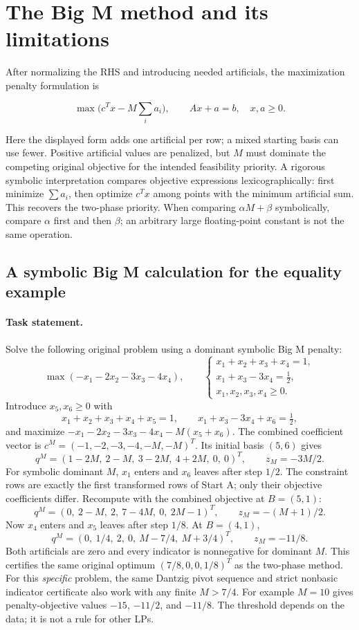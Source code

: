 \documentclass[11pt,a4paper]{article}
\begin{document}
\section{The Big M method and its limitations}\label{sec:big-m}
After normalizing the RHS and introducing needed artificials, the maximization
penalty formulation is
\begin{lecturecore}
  \begin{equation}\label{eq:big-m}
    \max\bigl(c^Tx-M\textstyle\sum_i a_i\bigr),\qquad
    Ax+a=b,\quad x,a\geq0.
  \end{equation}
\end{lecturecore}
Here the displayed form adds one artificial per row; a mixed starting basis
can use fewer. Positive artificial values are penalized, but $M$ must dominate
the competing original objective for the intended feasibility priority.
A rigorous symbolic interpretation compares objective expressions
lexicographically: first minimize $\sum a_i$, then optimize $c^Tx$ among
points with the minimum artificial sum. This recovers the two-phase priority.
When comparing $\alpha M+\beta$ symbolically, compare $\alpha$ first and then
$\beta$; an arbitrary large floating-point constant is not the same operation.

\Needspace{14cm}
\subsection{A symbolic Big M calculation for the equality example}
\paragraph{Task statement.}
Solve the following original problem using a dominant symbolic Big M penalty:
\[
  \max(-x_1-2x_2-3x_3-4x_4),\qquad
  \begin{cases}
    x_1+x_2+x_3+x_4=1,     \\
    x_1+x_3-3x_4=\tfrac12, \\
    x_1,x_2,x_3,x_4\geq0.
  \end{cases}
\]
Introduce $x_5,x_6\geq0$ with
\[
  x_1+x_2+x_3+x_4+x_5=1,\qquad
  x_1+x_3-3x_4+x_6=\tfrac12,
\]
and maximize $-x_1-2x_2-3x_3-4x_4-M(x_5+x_6)$.
The combined coefficient vector is
$c^M=(-1,-2,-3,-4,-M,-M)^T$. Its initial basis $(5,6)$ gives
\[
  q^M=(1-2M,\ 2-M,\ 3-2M,\ 4+2M,\ 0,\ 0)^T,
  \qquad z_M=-3M/2.
\]
For symbolic dominant $M$, $x_1$ enters and $x_6$ leaves after step $1/2$.
The constraint rows are exactly the first transformed rows of Start A;
only their objective coefficients differ. Recompute with the combined
objective at $B=(5,1)$:
\[
  q^M=(0,\ 2-M,\ 2,\ 7-4M,\ 0,\ 2M-1)^T,
  \qquad z_M=-(M+1)/2.
\]
Now $x_4$ enters and $x_5$ leaves after step $1/8$. At $B=(4,1)$,
\[
  q^M=(0,\ 1/4,\ 2,\ 0,\ M-7/4,\ M+3/4)^T,
  \qquad z_M=-11/8.
\]
Both artificials are zero and every indicator is nonnegative for dominant $M$.
This certifies the same original optimum $(7/8,0,0,1/8)^T$ as the two-phase
method. For this \emph{specific} problem, the same Dantzig pivot sequence and
strict nonbasic indicator certificate also work with any finite $M>7/4$.
For example $M=10$ gives penalty-objective values $-15$, $-11/2$, and $-11/8$.
The threshold depends on the data; it is not a rule for other LPs.
\end{document}
